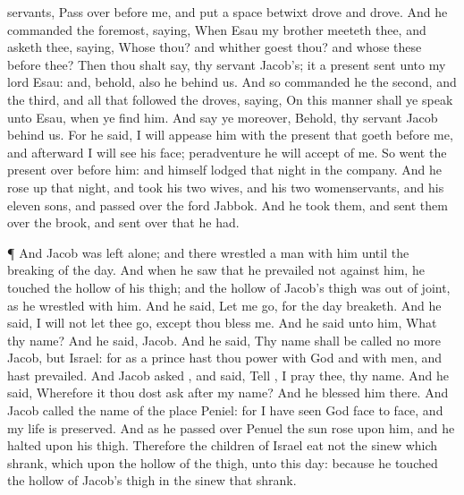 {servants, Pass
over before
me, and
put a
space
betwixt
drove
and
drove.
And he
commanded the
foremost,
saying, When
Esau my
brother meeteth
thee, and asketh
thee,
saying, Whose
{} thou? and whither
goest thou? and whose
{} these
before thee?
Then thou shalt
say,
{} thy
servant
Jacob’s; it
{} a
present
sent unto my
lord
Esau: and, behold, also he
{} behind
us.
And
so commanded
he the
second, and the
third, and all that
followed the
droves,
saying, On this
manner shall ye
speak unto
Esau, when ye
find him.
And say
ye
moreover, Behold, thy
servant
Jacob
{} behind
us. For he
said, I will
appease
him with the
present that
goeth before
me, and
afterward I will
see his
face; peradventure he will
accept of
me.
So
went the
present
over before
him: and himself
lodged that
night in the
company.
And he rose
up that
night, and
took his
two
wives, and his
two
womenservants, and his
eleven
sons, and passed
over the
ford
Jabbok.
And he took
them, and sent them
over the
brook, and sent
over that he had.
\par }{\PP {}¶ And
Jacob was
left alone; and there
wrestled a
man with him until the
breaking of the
day.
And when he
saw that he
prevailed not against him, he
touched the hollow of his
thigh; and the
hollow of
Jacob’s
thigh was out of
joint, as he
wrestled with him.
And he
said, Let me
go, for the
day
breaketh. And he
said, I will not let thee
go,
except thou
bless me.
And he
said unto him, What
{} thy
name? And he
said,
Jacob.
And he
said, Thy
name shall be
called no more
Jacob, but
Israel: for as a prince hast thou
power with
God and with
men, and hast
prevailed.
And
Jacob
asked
{}, and
said,
Tell
{}, I pray thee, thy
name. And he
said, Wherefore
{}
it
{} thou dost
ask after my
name? And he
blessed him there.
And
Jacob
called the
name of the
place
Peniel: for I have
seen
God
face to
face, and my
life is
preserved.
And as he passed
over
Penuel the
sun
rose upon him, and he
halted upon his
thigh.
Therefore the
children of
Israel
eat not
{} the
sinew which
shrank, which
{} upon the
hollow of the
thigh, unto this
day: because he
touched the
hollow of
Jacob’s
thigh in the
sinew that
shrank.

}
